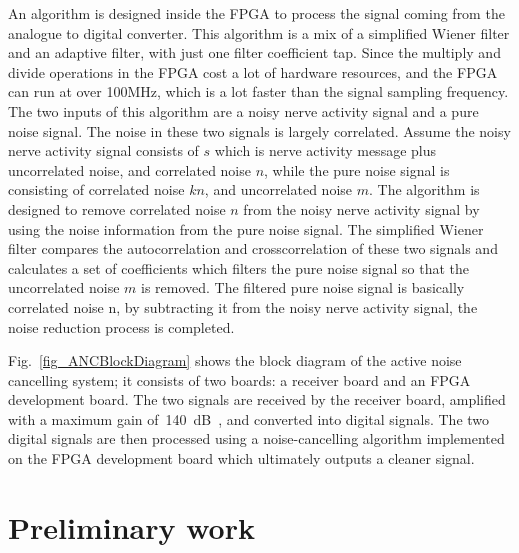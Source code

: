An algorithm is designed inside the FPGA to process the signal coming from the analogue to digital converter.  This algorithm is a mix of a simplified Wiener filter and an adaptive filter, with just one filter coefficient tap.  Since the multiply and divide operations in the FPGA cost a lot of hardware resources, and the FPGA can run at over 100MHz, which is a lot faster than the signal sampling frequency.  The two inputs of this algorithm are a noisy nerve activity signal and a pure noise signal.  The noise in these two signals is largely correlated.  Assume the noisy nerve activity signal consists of $s$ which is nerve activity message plus uncorrelated noise, and correlated noise $n$, while the pure noise signal is consisting of correlated noise $kn$, and uncorrelated noise $m$.  The algorithm is designed to remove correlated noise $n$ from the noisy nerve activity signal by using the noise information from the pure noise signal.  The simplified Wiener filter compares the autocorrelation and crosscorrelation of these two signals and calculates a set of coefficients which filters the pure noise signal so that the uncorrelated noise $m$ is removed.  The filtered pure noise signal is basically correlated noise n, by subtracting it from the noisy nerve activity signal, the noise reduction process is completed.

Fig.~\ref{fig_ANCBlockDiagram} shows the block diagram of the active noise cancelling system;  it consists of two boards: a receiver board and an FPGA development board.  The two signals are received by the receiver board, amplified with a maximum gain of~\qty{140}{dB\Omega}, and converted into digital signals.  The two digital signals are then processed using a noise-cancelling algorithm implemented on the FPGA development board which ultimately outputs a cleaner signal.


\section{Preliminary work}

